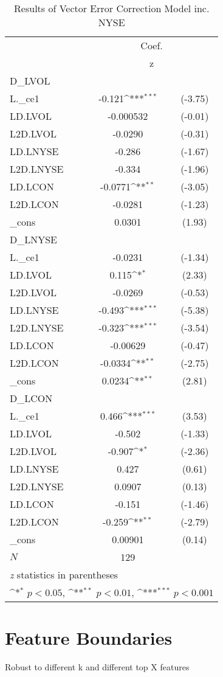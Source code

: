 \begin{table}
\begin{center}
\caption[VECM Results w/ NYSE Volume]{Results of Vector Error Correction Model inc. NYSE\label{vec2}}
\vspace{0.3in}
{
\def\sym#1{\ifmmode^{#1}\else\(^{#1}\)\fi}
\begin{tabular}{l*{1}{cc}}
\hline\hline
          &\multicolumn{2}{c}{Coef.}     \\
          &\multicolumn{2}{c}{z}        \\
\hline
D\_LVOL    &                  &         \\
L.\_ce1    &   -0.121\sym{***}&  (-3.75)\\
LD.LVOL   &-0.000532         &  (-0.01)\\
L2D.LVOL  &  -0.0290         &  (-0.31)\\
LD.LNYSE&   -0.286         &  (-1.67)\\
L2D.LNYSE&   -0.334         &  (-1.96)\\
LD.LCON   &  -0.0771\sym{**} &  (-3.05)\\
L2D.LCON  &  -0.0281         &  (-1.23)\\
\_cons    &   0.0301         &   (1.93)\\
\hline
D\_LNYSE&                  &         \\
L.\_ce1    &  -0.0231         &  (-1.34)\\
LD.LVOL   &    0.115\sym{*}  &   (2.33)\\
L2D.LVOL  &  -0.0269         &  (-0.53)\\
LD.LNYSE&   -0.493\sym{***}&  (-5.38)\\
L2D.LNYSE&   -0.323\sym{***}&  (-3.54)\\
LD.LCON   & -0.00629         &  (-0.47)\\
L2D.LCON  &  -0.0334\sym{**} &  (-2.75)\\
\_cons    &   0.0234\sym{**} &   (2.81)\\
\hline
D\_LCON    &                  &         \\
L.\_ce1    &    0.466\sym{***}&   (3.53)\\
LD.LVOL   &   -0.502         &  (-1.33)\\
L2D.LVOL  &   -0.907\sym{*}  &  (-2.36)\\
LD.LNYSE&    0.427         &   (0.61)\\
L2D.LNYSE&   0.0907         &   (0.13)\\
LD.LCON   &   -0.151         &  (-1.46)\\
L2D.LCON  &   -0.259\sym{**} &  (-2.79)\\
\_cons    &  0.00901         &   (0.14)\\
\hline
\(N\)     &      129         &         \\
\hline\hline
\multicolumn{3}{l}{\footnotesize \textit{z} statistics in parentheses}\\
\multicolumn{3}{l}{\footnotesize \sym{*} \(p<0.05\), \sym{**} \(p<0.01\), \sym{***} \(p<0.001\)}\\
\end{tabular}
}

\end{center}
\end{table}

\section{Feature Boundaries}
Robust to different k and different top X features

